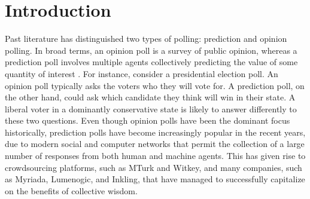 \documentclass[11pt]{article}
\theoremstyle{definition}
\theoremstyle{definition}
\begin{document}


\section{Introduction}
Past literature has distinguished two types of polling: prediction and opinion polling. In broad terms, an opinion poll is a survey of public opinion, whereas a prediction poll involves multiple agents collectively predicting the value of some quantity of interest \citep{goel2010prediction, mellers2014psychological}. For instance, consider a presidential election poll. An opinion poll typically asks the voters who they will vote for. A prediction poll, on the other hand, could ask which candidate they think will win in their state. A liberal voter in a dominantly conservative state is likely to answer differently to these two questions. 
Even though opinion polls have been the dominant focus historically, prediction polls have become increasingly popular in the recent years, due to modern social and computer networks  that permit the collection of a large number of responses from both human and machine agents. This has given rise to crowdsourcing platforms, such as MTurk and Witkey, and many companies, such as Myriada, Lumenogic, and Inkling, that have managed to successfully  capitalize on the benefits of collective wisdom. 





% 
%
% 
\end{document}

